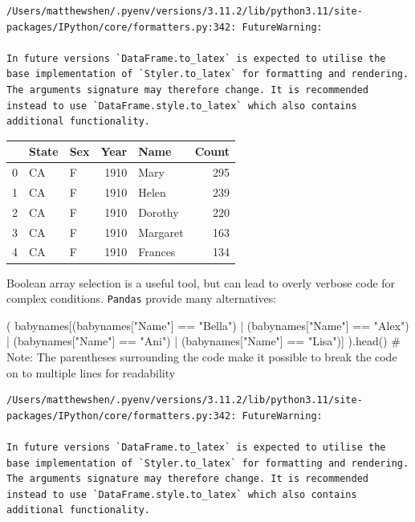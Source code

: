 \documentclass[
  letterpaper,
  DIV=11,
  numbers=noendperiod]{scrreprt}
\newenvironment{Shaded}{\begin{snugshade}}{\end{snugshade}}
\newcommand{\CommentTok}[1]{\textcolor[rgb]{0.37,0.37,0.37}{#1}}
\newcommand{\NormalTok}[1]{\textcolor[rgb]{0.00,0.23,0.31}{#1}}
\newcommand{\OperatorTok}[1]{\textcolor[rgb]{0.37,0.37,0.37}{#1}}
\newcommand{\StringTok}[1]{\textcolor[rgb]{0.13,0.47,0.30}{#1}}
\begin{document}
\begin{verbatim}
/Users/matthewshen/.pyenv/versions/3.11.2/lib/python3.11/site-packages/IPython/core/formatters.py:342: FutureWarning:

In future versions `DataFrame.to_latex` is expected to utilise the base implementation of `Styler.to_latex` for formatting and rendering. The arguments signature may therefore change. It is recommended instead to use `DataFrame.style.to_latex` which also contains additional functionality.
\end{verbatim}

\begin{tabular}{lllrlr}
\toprule
{} & State & Sex &  Year &      Name &  Count \\
\midrule
0 &    CA &   F &  1910 &      Mary &    295 \\
1 &    CA &   F &  1910 &     Helen &    239 \\
2 &    CA &   F &  1910 &   Dorothy &    220 \\
3 &    CA &   F &  1910 &  Margaret &    163 \\
4 &    CA &   F &  1910 &   Frances &    134 \\
\bottomrule
\end{tabular}

Boolean array selection is a useful tool, but can lead to overly verbose
code for complex conditions. \texttt{Pandas} provide many alternatives:

\begin{Shaded}
\begin{Highlighting}[]
\NormalTok{(}
\NormalTok{    babynames[(babynames[}\StringTok{"Name"}\NormalTok{] }\OperatorTok{==} \StringTok{"Bella"}\NormalTok{) }\OperatorTok{|} 
\NormalTok{              (babynames[}\StringTok{"Name"}\NormalTok{] }\OperatorTok{==} \StringTok{"Alex"}\NormalTok{) }\OperatorTok{|}
\NormalTok{              (babynames[}\StringTok{"Name"}\NormalTok{] }\OperatorTok{==} \StringTok{"Ani"}\NormalTok{) }\OperatorTok{|}
\NormalTok{              (babynames[}\StringTok{"Name"}\NormalTok{] }\OperatorTok{==} \StringTok{"Lisa"}\NormalTok{)]}
\NormalTok{).head()}
\CommentTok{\# Note: The parentheses surrounding the code make it possible to break the code on to multiple lines for readability}
\end{Highlighting}
\end{Shaded}

\begin{verbatim}
/Users/matthewshen/.pyenv/versions/3.11.2/lib/python3.11/site-packages/IPython/core/formatters.py:342: FutureWarning:

In future versions `DataFrame.to_latex` is expected to utilise the base implementation of `Styler.to_latex` for formatting and rendering. The arguments signature may therefore change. It is recommended instead to use `DataFrame.style.to_latex` which also contains additional functionality.
\end{verbatim}
\end{document}
